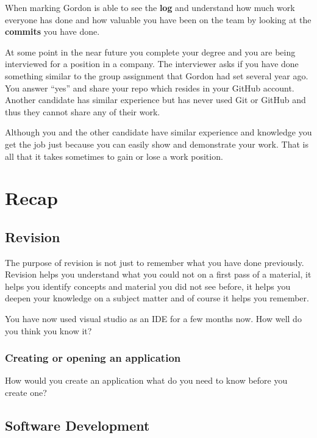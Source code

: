 \documentclass[
]{book}
\begin{document}
When marking Gordon is able to see the \textbf{log} and understand how much work everyone has done and how valuable you have been on the team by looking at the \textbf{commits} you have done.

At some point in the near future you complete your degree and you are being interviewed for a position in a company.
The interviewer asks if you have done something similar to the group assignment that Gordon had set several year ago. You answer ``yes'' and share your repo which resides in your GitHub account.
Another candidate has similar experience but has never used Git or GitHub and thus they cannot share any of their work.

Although you and the other candidate have similar experience and knowledge you get the job just because you can easily show and demonstrate your work. That is all that it takes sometimes to gain or lose a work position.

\hypertarget{recap}{%
\chapter{Recap}\label{recap}}

\hypertarget{revision}{%
\section{Revision}\label{revision}}

The purpose of revision is not just to remember what you have done previously. Revision helps you understand what you could not on a first pass of a material, it helps you identify concepts and material you did not see before, it helps you deepen your knowledge on a subject matter and of course it helps you remember.

You have now used visual studio as an IDE for a few months now. How well do you think you know it?

\hypertarget{creating-or-opening-an-application}{%
\subsection{Creating or opening an application}\label{creating-or-opening-an-application}}

How would you create an application what do you need to know before you create one?

\hypertarget{software-development}{%
\section{Software Development}\label{software-development}}
\end{document}
